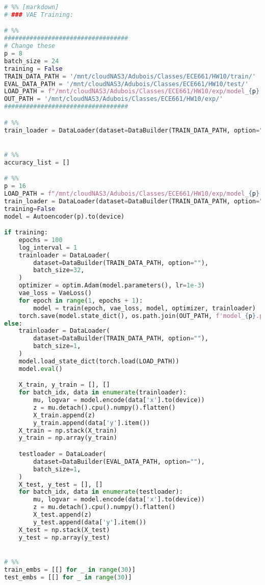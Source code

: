 \documentclass{article}
\begin{document}
\begin{lstlisting}[language=Python]
# %% [markdown]
# ### VAE Training:

# %%
##################################
# Change these
p = 8
batch_size = 24
training = False
TRAIN_DATA_PATH = '/mnt/cloudNAS3/Adubois/Classes/ECE661/HW10/train/'
EVAL_DATA_PATH = '/mnt/cloudNAS3/Adubois/Classes/ECE661/HW10/test/'
LOAD_PATH = f"/mnt/cloudNAS3/Adubois/Classes/ECE661/HW10/exp/model_{p}.pt"
OUT_PATH = '/mnt/cloudNAS3/Adubois/Classes/ECE661/HW10/exp/'
##################################

# %%
train_loader = DataLoader(dataset=DataBuilder(TRAIN_DATA_PATH, option="bw"), batch_size=batch_size, shuffle=True)


# %%
accuracy_list = []

# %%
p = 16
LOAD_PATH = f"/mnt/cloudNAS3/Adubois/Classes/ECE661/HW10/exp/model_{p}.pt"
train_loader = DataLoader(dataset=DataBuilder(TRAIN_DATA_PATH, option="bw"), batch_size=batch_size, shuffle=True)
training=False
model = Autoencoder(p).to(device)

if training:
    epochs = 100
    log_interval = 1
    trainloader = DataLoader(
        dataset=DataBuilder(TRAIN_DATA_PATH, option=""),
        batch_size=32,
    )
    optimizer = optim.Adam(model.parameters(), lr=1e-3)
    vae_loss = VaeLoss()
    for epoch in range(1, epochs + 1):
        model = train(epoch, vae_loss, model, optimizer, trainloader)
    torch.save(model.state_dict(), os.path.join(OUT_PATH, f'model_{p}.pt'))
else:
    trainloader = DataLoader(
        dataset=DataBuilder(TRAIN_DATA_PATH, option=""),
        batch_size=1,
    )
    model.load_state_dict(torch.load(LOAD_PATH))
    model.eval()

    X_train, y_train = [], []
    for batch_idx, data in enumerate(trainloader):
        mu, logvar = model.encode(data['x'].to(device))
        z = mu.detach().cpu().numpy().flatten()
        X_train.append(z)
        y_train.append(data['y'].item())
    X_train = np.stack(X_train)
    y_train = np.array(y_train)

    testloader = DataLoader(
        dataset=DataBuilder(EVAL_DATA_PATH, option=""),
        batch_size=1,
    )
    X_test, y_test = [], []
    for batch_idx, data in enumerate(testloader):
        mu, logvar = model.encode(data['x'].to(device))
        z = mu.detach().cpu().numpy().flatten()
        X_test.append(z)
        y_test.append(data['y'].item())
    X_test = np.stack(X_test)
    y_test = np.array(y_test)


# %%
train_embs = [[] for _ in range(30)]
test_embs = [[] for _ in range(30)]


\end{lstlisting}
\end{document}
